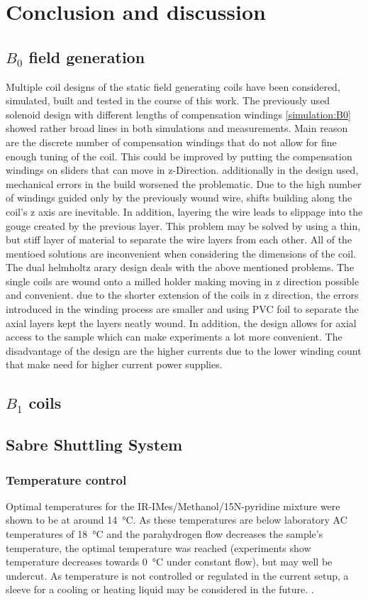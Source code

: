 \chapter{Conclusion and discussion}\label{chap:conclusion}
    \section{$B_0$ field generation}
        Multiple coil designs of the static field generating coils have been considered, simulated, built and tested in the course of this work. The previously used solenoid design with different lengths of compensation windings \ref{simulation:B0} showed rather broad lines in both simulations and measurements. Main reason are the discrete number of compensation windings that do not allow for fine enough tuning of the coil. This could be improved by putting the compensation windings on sliders that can move in z-Direction. additionally in the design used, mechanical errors in the build worsened the problematic. Due to the high number of windings guided only by the previously wound wire, shifts building along the coil's z axis are inevitable. In addition, layering the wire leads to slippage into the gouge created by the previous layer. This problem may be solved by using a thin, but stiff layer of material to separate the wire layers from each other. All of the mentioed solutions are inconvenient when considering the dimensions of the coil.
        The dual helmholtz arary design deals with the above mentioned problems. The single coils are wound onto a milled holder making moving in z direction possible and convenient. due to the shorter extension of the coils in z direction, the errors introduced in the winding process are smaller and using PVC foil to separate the axial layers kept the layers neatly wound.
        In addition, the design allows for axial access to the sample which can make experiments a lot more convenient. The disadvantage of the design are the higher currents due to the lower winding count that make need for higher current power supplies.
    \section{$B_1$ coils}
    \section{Sabre Shuttling System}
        \subsection{Temperature control}
        \label{cd:sabreShuttling:tempControl}
            Optimal temperatures for the IR-IMes/Methanol/15N-pyridine mixture were shown to be at around \SI{14}{\celsius}. As these temperatures are below laboratory AC temperatures of \SI{18}{\celsius} and the parahydrogen flow decreases the sample's temperature, the optimal temperature was reached (experiments show temperature decreases towards \SI{0}{\celsius} under constant flow), but may well be undercut. As temperature is not controlled or regulated in the current setup, a sleeve for a cooling or heating liquid may be considered in the future. .

